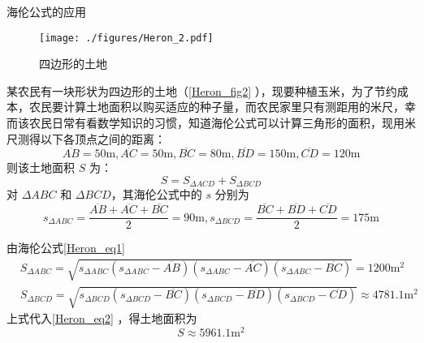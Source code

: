 \begin{example}{海伦公式的应用}
\begin{figure}[ht]
\centering
\texttt{[image: ./figures/Heron\_2.pdf]}
\caption{四边形的土地}\label{Heron_fig2}
\end{figure}
某农民有一块形状为四边形的土地（\autoref{Heron_fig2} ），现要种植玉米，为了节约成本，农民要计算土地面积以购买适应的种子量，而农民家里只有测距用的米尺，幸而该农民日常有看数学知识的习惯，知道海伦公式可以计算三角形的面积，现用米尺测得以下各顶点之间的距离：
\begin{equation}
\overline{AB}=50\mathrm{m},\overline{AC}=50\mathrm{m},\overline{BC}=80\mathrm{m},\overline{BD}=150\mathrm{m},\overline{CD}=120\mathrm{m}
\end{equation}
则该土地面积 $S$ 为：
\begin{equation}\label{Heron_eq2}
S=S_{\Delta ACD}+S_{\Delta BCD}
\end{equation}
对 $\Delta ABC$ 和 $\Delta BCD$，其海伦公式中的 $s$ 分别为
\begin{equation}
s_{\Delta ABC}=\frac{\overline{AB}+\overline{AC}+\overline{BC}}{2}=90\mathrm{m}
,
s_{\Delta BCD}=\frac{\overline{BC}+\overline{BD}+\overline{CD}}{2}=175\mathrm{m}
\end{equation}


由海伦公式\autoref{Heron_eq1} 
\begin{equation}
\begin{aligned}
&S_{\Delta ABC}=\sqrt{s_{\Delta ABC}(s_{\Delta ABC}-\overline{AB})(s_{\Delta ABC}-\overline{AC})(s_{\Delta ABC}-\overline{BC})}=1200\mathrm{m^2}
\\
&S_{\Delta BCD}=\sqrt{s_{\Delta BCD}(s_{\Delta BCD}-\overline{BC})(s_{\Delta BCD}-\overline{BD})(s_{\Delta BCD}-\overline{CD})}\approx 4781.1\mathrm{m^2}
\end{aligned}
\end{equation}
上式代入\autoref{Heron_eq2} ，得土地面积为
\begin{equation}
S\approx 5961.1\mathrm{m^2}
\end{equation}
\end{example}
